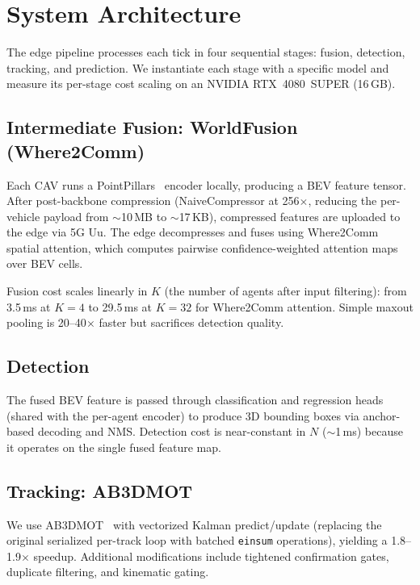 \section{System Architecture}
\label{sec:architecture}



The edge pipeline processes each tick in four sequential stages:
fusion, detection, tracking, and prediction.  We instantiate each
stage with a specific model and measure its per-stage cost scaling
on an NVIDIA RTX~4080~SUPER (16\,GB).

\subsection{Intermediate Fusion: WorldFusion (Where2Comm)}

Each CAV runs a PointPillars~\cite{lang2019pointpillars} encoder
locally, producing a BEV feature tensor.  After post-backbone
compression (NaiveCompressor at 256$\times$, reducing the per-vehicle
payload from $\sim$10\,MB to $\sim$17\,KB), compressed features are
uploaded to the edge via 5G Uu.  The edge decompresses and fuses using
Where2Comm~\cite{hu2022where2comm} spatial attention, which computes
pairwise confidence-weighted attention maps over BEV cells.

Fusion cost scales linearly in $K$ (the number of agents after input
filtering): from 3.5\,ms at $K=4$ to 29.5\,ms at $K=32$ for
Where2Comm attention.  Simple maxout pooling is 20--40$\times$ faster
but sacrifices detection quality.

\subsection{Detection}

The fused BEV feature is passed through classification and regression
heads (shared with the per-agent encoder) to produce 3D bounding
boxes via anchor-based decoding and NMS.  Detection cost is near-constant
in $N$ ($\sim$1\,ms) because it operates on the single fused feature
map.

\subsection{Tracking: AB3DMOT}

We use AB3DMOT~\cite{ab3dmotTracker2020} with vectorized Kalman
predict/update (replacing the original serialized per-track loop with
batched \texttt{einsum} operations), yielding a 1.8--1.9$\times$
speedup.  Additional modifications include tightened confirmation
gates, duplicate filtering, and kinematic gating.

